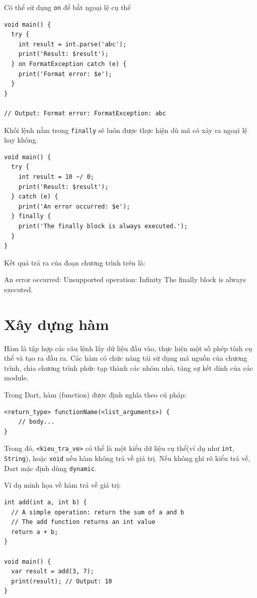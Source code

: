 \documentclass[../DoAn.tex]{subfiles}
\numberwithin{figure}{chapter}
\begin{document}
Có thể sử dụng \texttt{on} để bắt ngoại lệ cụ thể
\begin{lstlisting}
void main() {
  try {
    int result = int.parse('abc');
    print('Result: $result');
  } on FormatException catch (e) {
    print('Format error: $e');
  }
}

// Output: Format error: FormatException: abc
\end{lstlisting}

Khối lệnh nằm trong \texttt{finally} sẽ luôn được thực hiện dù mã có xảy ra ngoại lệ hay không.
\begin{lstlisting}
void main() {
  try {
    int result = 10 ~/ 0;
    print('Result: $result');
  } catch (e) {
    print('An error occurred: $e');
  } finally {
    print('The finally block is always executed.');
  }
}
\end{lstlisting}

Kết quả trả ra của đoạn chương trình trên là: 
\begin{myverbatim}
An error occurred: Unsupported operation: Infinity
The finally block is always executed.
\end{myverbatim}

\section{Xây dựng hàm}
Hàm là tập hợp các câu lệnh lấy dữ liệu đầu vào, thực hiện một số phép tính cụ thể và tạo ra đầu ra. Các hàm có chức năng tái sử dụng mã nguồn của chương trình, chia chương trình phức tạp thành các nhóm nhỏ, tăng sự kết dính của các module.

Trong Dart, hàm (function) được định nghĩa theo cú pháp:
\begin{lstlisting}
<return_type> functionName(<list_arguments>) {
    // body...
}
\end{lstlisting}

Trong đó, \texttt{<kieu\_tra\_ve>} có thể là một kiểu dữ liệu cụ thể(ví dụ như \texttt{int}, \texttt{String}), hoặc \texttt{void} nếu hàm không trả về giá trị. Nếu không ghi rõ kiểu trả về, Dart mặc định dùng \texttt{dynamic}.

Ví dụ minh họa về hàm trả về giá trị:
\begin{lstlisting}
int add(int a, int b) {
  // A simple operation: return the sum of a and b
  // The add function returns an int value
  return a + b;
}

void main() {
  var result = add(3, 7);
  print(result); // Output: 10
}
\end{lstlisting}
\end{document}
